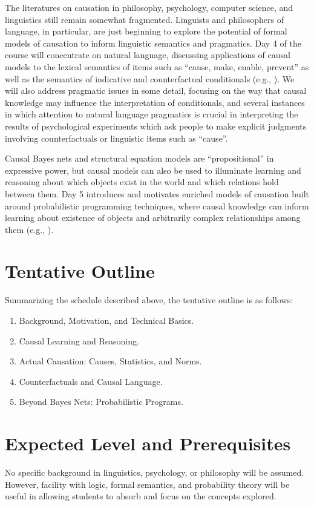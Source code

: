 \documentclass[english]{article}
\begin{document}
The literatures on causation in philosophy, psychology, computer science, and linguistics still remain somewhat fragmented. Linguists and philosophers of language, in particular, are just beginning to explore the potential of formal models of causation to inform linguistic semantics and pragmatics. Day 4 of the course will concentrate on natural language, discussing applications of causal models to the lexical semantics of items such as ``cause, make, enable, prevent'' \citep{wolff03,sloman09} as well as the semantics of indicative and counterfactual conditionals (e.g., \citealt{pearl00,schulz07,sloman05b,deghanietal12,kaufmann13}). We will also address pragmatic issues in some detail, focusing on the way that causal knowledge may influence the interpretation of conditionals, and several instances in which attention to natural language pragmatics is crucial in interpreting the results of psychological experiments which ask people to make explicit judgments involving counterfactuals or linguistic items such as ``cause''.

Causal Bayes nets and structural equation models are ``propositional'' in expressive power, but causal models can also be used to illuminate learning and reasoning about which objects exist in the world and which relations hold between them. Day 5 introduces and motivates enriched models of causation built around probabilistic programming techniques, where causal knowledge can inform learning about existence of objects and arbitrarily complex relationships among them (e.g., \citealt{goodmanetal08,gerstenberg17}). 

\section*{\large{Tentative Outline}}

Summarizing the schedule described above, the tentative outline is as follows:

\normalsize{
\begin{enumerate}
  \item Background, Motivation, and Technical Basics.
  \item Causal Learning and Reasoning.
  \item Actual Causation: Causes, Statistics, and Norms.
  \item Counterfactuals and Causal Language.
  \item Beyond Bayes Nets: Probabilistic Programs.
\end{enumerate}
}

\section*{\large{Expected Level and Prerequisites}}
No specific background in linguistics, psychology, or philosophy will be assumed. However, facility with logic, formal semantics, and probability theory will be useful in allowing students to absorb and focus on the concepts explored. 



 
\end{document}
